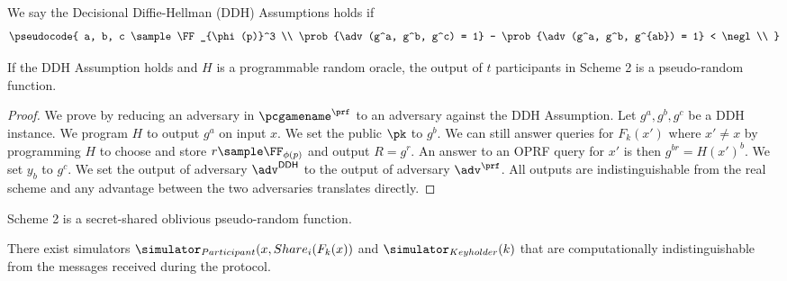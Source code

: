 \begin{definition}
We say the Decisional Diffie-Hellman (DDH) Assumptions holds if
$$
\pseudocode{
a, b, c \sample \FF_{\phi(p)}^3 \\
\prob{\adv(g^a, g^b, g^c) = 1} - \prob{\adv(g^a, g^b, g^{ab}) = 1} < \negl \\
}
$$
\end{definition}

\begin{theorem}
\label{thm:sec_prf}
If the DDH Assumption holds and $H$ is a programmable random oracle, the output of $t$ participants in Scheme 2 is a pseudo-random function.
\end{theorem}

\begin{proof}
We prove by reducing an adversary in $\pcgamename^{\prf}$ to an adversary against the DDH Assumption.
Let $g^a, g^b, g^c$ be a DDH instance.
We program $H$ to output $g^a$ on input $x$.
We set the public $\pk$ to $g^b$.
We can still answer queries for $F_{k}(x')$ where $x' \neq x$ by programming $H$ to choose and store $r \sample \FF_{\phi(p)}$ and output $R = g^r$.
An answer to an OPRF query for $x'$ is then $g^{b r} = H(x')^b$.
We set $y_b$ to $g^c$.
We set the output of adversary $\adv^{\mathsf{DDH}}$ to the output of adversary $\adv^{\prf}$.
All outputs are indistinguishable from the real scheme and any advantage between the two adversaries translates directly.
\end{proof}

\begin{theorem}
Scheme 2 is a secret-shared oblivious pseudo-random function.
\end{theorem}

\begin{corollary}
There exist simulators $\simulator_{Participant}(x, Share_{i}(F_{k}(x))$ and $\simulator_{Keyholder}(k)$ that are computationally indistinguishable from the messages received during the protocol.
\end{corollary}

